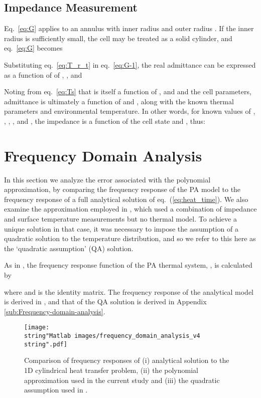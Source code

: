 \documentclass[journal, english]{IEEEtran}
\begin{document}
\subsection{Impedance Measurement}
Eq.\ \ref{eq:G} applies to an annulus with inner radius  and
outer radius . If the inner radius is sufficiently small,
the cell may be treated as a solid cylinder, and eq.\ \ref{eq:G} becomes


Substituting eq.\ \ref{eq:T_r_t} in eq.\ \ref{eq:G-1}, the real admittance
can be expressed as a function of of , ,
and 

Noting from eq.\ \ref{eq:Ts} that  is itself a function
of ,  and  and the
cell parameters, admittance is ultimately a function of  and ,
along with the known thermal parameters and environmental temperature.
In other words, for known values of , ,
, , and , the impedance is a function of the cell
state and , thus: 


\section{Frequency Domain Analysis\label{sec:Frequency-Domain-Analysis}}
In this section we analyze the error associated with the polynomial approximation, by comparing the frequency response of the PA model to the frequency response of a full analytical solution of eq.\ (\ref{eq:heat_time}). We also examine the approximation employed in \cite{Richardson2014}, which used a combination
of impedance and surface temperature measurements but no thermal model.
To achieve a unique solution in that case, it was necessary to impose the assumption of 
a quadratic solution to the temperature distribution, and so
we refer to this here as the `quadratic assumption' (QA) solution. 

As in \cite{Kim2013}, the frequency response function of the PA thermal
system, , is calculated by


where  and  is the identity matrix. The frequency
response of the analytical model is derived in \cite{Muratori2010a}, and that of the QA solution is derived in Appendix \ref{sub:Frequency-domain-analysis}.

\begin{figure}[h]
\begin{centering}
\texttt{[image: \\string"Matlab images/frequency\_domain\_analysis\_v4\\string".pdf]}
\par\end{centering}
\caption{Comparison of frequency responses of (i) analytical solution to the
1D cylindrical heat transfer problem, (ii) the polynomial approximation
used in the current study and (iii) the quadratic assumption
used in \cite{Richardson2014}.\label{fig:Frequency-response}}
\end{figure}
\end{document}
